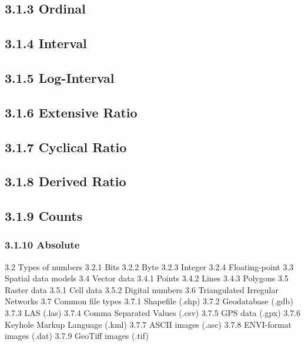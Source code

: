 \documentclass[
]{book}
\begin{document}
\hypertarget{ordinal}{%
\subsection{3.1.3 Ordinal}\label{ordinal}}

\hypertarget{interval}{%
\subsection{3.1.4 Interval}\label{interval}}

\hypertarget{log-interval}{%
\subsection{3.1.5 Log-Interval}\label{log-interval}}

\hypertarget{extensive-ratio}{%
\subsection{3.1.6 Extensive Ratio}\label{extensive-ratio}}

\hypertarget{cyclical-ratio}{%
\subsection{3.1.7 Cyclical Ratio}\label{cyclical-ratio}}

\hypertarget{derived-ratio}{%
\subsection{3.1.8 Derived Ratio}\label{derived-ratio}}

\hypertarget{counts}{%
\subsection{3.1.9 Counts}\label{counts}}

\hypertarget{absolute}{%
\subsubsection{3.1.10 Absolute}\label{absolute}}

3.2 Types of numbers
3.2.1 Bits
3.2.2 Byte
3.2.3 Integer
3.2.4 Floating-point
3.3 Spatial data models
3.4 Vector data
3.4.1 Points
3.4.2 Lines
3.4.3 Polygons
3.5 Raster data
3.5.1 Cell data
3.5.2 Digital numbers
3.6 Triangulated Irregular Networks
3.7 Common file types
3.7.1 Shapefile (.shp)
3.7.2 Geodatabase (.gdb)
3.7.3 LAS (.las)
3.7.4 Comma Separated Values (.csv)
3.7.5 GPS data (.gpx)
3.7.6 Keyhole Markup Language (.kml)
3.7.7 ASCII images (.asc)
3.7.8 ENVI-format images (.dat)
3.7.9 GeoTiff images (.tif)
\end{document}
